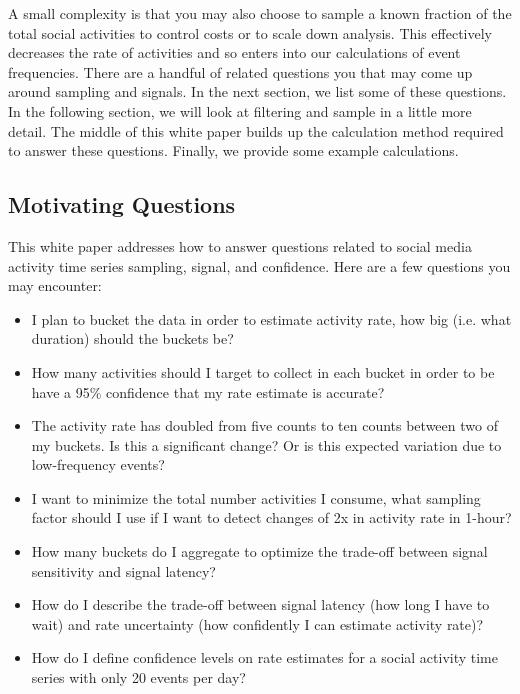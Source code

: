 \documentclass{article}
\begin{document}
A small complexity is that you may also choose to sample a known fraction of the total social activities to control costs or to scale down analysis.  This effectively decreases the rate of activities and so enters into our calculations of event frequencies.  
There are a handful of related questions you that may come up around sampling and signals.  In the next section, we list some of these questions. In the following section, we will look at filtering and sample in a little more detail.  The middle of this white paper builds up the calculation method required to answer these questions. Finally, we provide some example calculations.

\subsection{Motivating Questions} 


This white paper addresses how to answer questions related to social media activity time series sampling, signal, and confidence.  Here are a few questions you may encounter:

\begin{itemize}
\item I plan to bucket the data in order to estimate activity rate, how big (i.e. what duration) should the buckets be? 
\item How many activities should I target to collect in each bucket in order to be have a 95\% confidence that my rate estimate is accurate? 
\item The activity rate has doubled from five counts to ten counts between two of my buckets. Is this a significant change? Or is this expected variation due to low-frequency events?
\item I want to minimize the total number activities I consume, what sampling factor should I use if I want to detect changes of 2x in activity rate in 1-hour?
\item How many buckets do I aggregate to optimize the trade-off between signal sensitivity and signal latency?
\item How do I describe the trade-off between signal latency (how long I have to wait) and rate uncertainty (how confidently I can estimate activity rate)?
\item How do I define confidence levels on rate estimates for a social activity time series with only 20 events per day?
\end{itemize}
\end{document}
